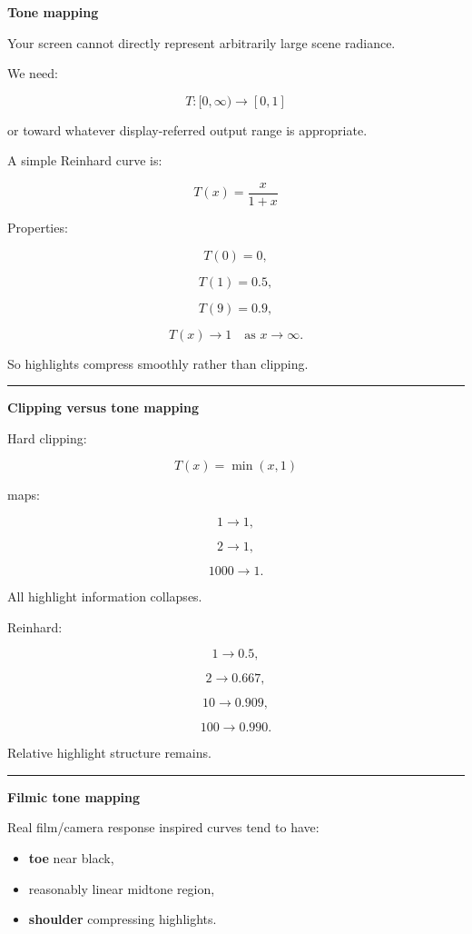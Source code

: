 \textbf{Tone mapping}

Your screen cannot directly represent arbitrarily large scene radiance.

We need:

\[
\boxed{
T:
[0,\infty)
\rightarrow
[0,1]
}
\]

or toward whatever display-referred output range is appropriate.

A simple Reinhard curve is:

\[
\boxed{
T(x)=\frac{x}{1+x}
}
\]

Properties:

\[
T(0)=0,
\]

\[
T(1)=0.5,
\]

\[
T(9)=0.9,
\]

\[
T(x)\rightarrow1
\quad \text{as }x\rightarrow\infty.
\]

So highlights compress smoothly rather than clipping.

\begin{center}\rule{0.5\linewidth}{0.5pt}\end{center}

\textbf{Clipping versus tone mapping}

Hard clipping:

\[
T(x)=\min(x,1)
\]

maps:

\[
1\rightarrow1,
\]

\[
2\rightarrow1,
\]

\[
1000\rightarrow1.
\]

All highlight information collapses.

Reinhard:

\[
1\rightarrow0.5,
\]

\[
2\rightarrow0.667,
\]

\[
10\rightarrow0.909,
\]

\[
100\rightarrow0.990.
\]

Relative highlight structure remains.

\begin{center}\rule{0.5\linewidth}{0.5pt}\end{center}

\textbf{Filmic tone mapping}

Real film/camera response inspired curves tend to have:

\begin{itemize}
\tightlist
\item
  \textbf{toe} near black,
\item
  reasonably linear midtone region,
\item
  \textbf{shoulder} compressing highlights.
\end{itemize}

